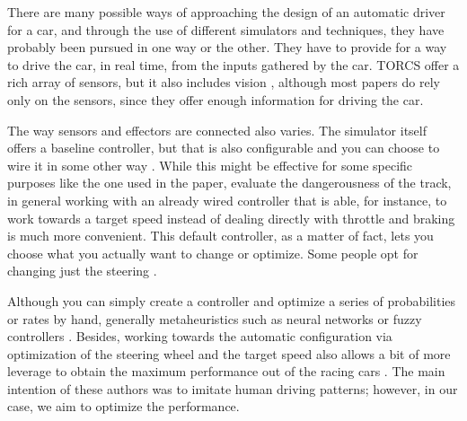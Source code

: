 \documentclass[10pt,journal,compsoc]{IEEEtran}
\begin{document}
There are many possible ways of approaching the design of an automatic
driver for a car, and through the use of different simulators and
techniques, they have probably been pursued in one way or the
other. They have to provide for a way to drive the car, in real time, from the inputs gathered by the car. TORCS offer a rich array of sensors, but it also includes vision \cite{zhu2018driving}, although most papers do rely only on the sensors, since they offer enough information for driving the car.

The way sensors and effectors are connected also varies. The simulator
itself offers a baseline controller, but that is also configurable and
you can choose to wire it in some other way
\cite{cussat2016dangerousness}. While this might be effective for some
specific purposes like the one used in the paper, evaluate the
dangerousness of the track, in general working with an already wired
controller that is able, for instance, to work towards a target speed
instead of dealing directly with throttle and braking is much more
convenient. This default controller, as a matter of fact, lets you
choose what you actually want to change or optimize. Some people opt for changing just the steering \cite{CarRacing_Pelta09,Nikulin:2018:EAC:3205455.3205547,LFAG}.

Although you can simply create a controller and optimize a series of
probabilities or rates by hand, generally metaheuristics such as
neural networks \cite{zhu2018driving} or fuzzy controllers
\cite{armagan2017fuzzy}. Besides, working towards the automatic
configuration via optimization of the steering wheel and the target speed also allows a bit of more leverage to obtain the maximum performance out of the
racing cars \cite{PerezEvolvingFuzzy09,Autopia2012}. The main intention of these authors was to imitate human driving patterns; however, in our case, we aim to optimize the performance.
\end{document}
